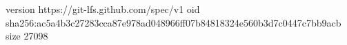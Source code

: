 version https://git-lfs.github.com/spec/v1
oid sha256:ac5a4b3c27283cca87e978ad048966ff07b84818324e560b3d7c0447c7bb9acb
size 27098
